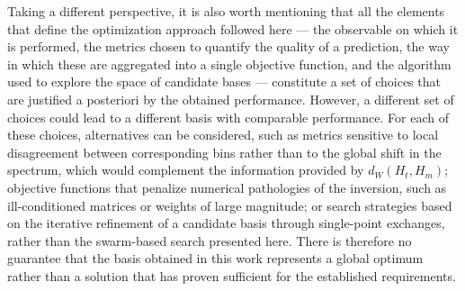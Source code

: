 Taking a different perspective, it is also worth mentioning that all the elements that define the optimization approach followed here — the observable on which it is performed, the metrics chosen to quantify the quality of a prediction, the way in which these are aggregated into a single objective function, and the algorithm used to explore the space of candidate bases — constitute a set of choices that are justified a posteriori by the obtained performance. However, a different set of choices could lead to a different basis with comparable performance. For each of these choices, alternatives can be considered, such as metrics sensitive to local disagreement between corresponding bins rather than to the global shift in the spectrum, which would complement the information provided by $d_W(H_{t},H_{m})$; objective functions that penalize numerical pathologies of the inversion, such as ill-conditioned matrices or weights of large magnitude; or search strategies based on the iterative refinement of a candidate basis through single-point exchanges, rather than the swarm-based search presented here. There is therefore no guarantee that the basis obtained in this work represents a global optimum rather than a solution that has proven sufficient for the established requirements.\\



